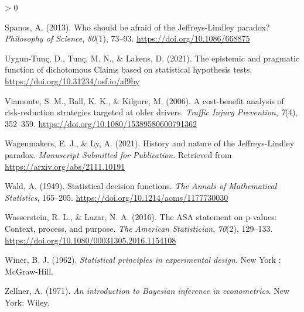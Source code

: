 \documentclass[
  english,
  ,man, a4paper,floatsintext]{apa6}
\newlength{\cslhangindent}
\newenvironment{CSLReferences}[2] %
 {%
  \setlength{\parindent}{0pt}
  \ifodd #1 \everypar{\setlength{\hangindent}{\cslhangindent}}\ignorespaces\fi
  \ifnum #2 > 0
  \setlength{\parskip}{#2\baselineskip}
  \fi
 }%
 {}
\begin{document}
\begin{CSLReferences}{1}{0}
\leavevmode\hypertarget{ref-spanos_2013}{}%
Spanos, A. (2013). Who should be afraid of the {Jeffreys}-{Lindley} paradox? \emph{Philosophy of Science}, \emph{80}(1), 73--93. \url{https://doi.org/10.1086/668875}

\leavevmode\hypertarget{ref-tunc_epistemic_2021}{}%
Uygun-Tunç, D., Tunç, M. N., \& Lakens, D. (2021). The epistemic and pragmatic function of dichotomous {Claims} based on statistical hypothesis tests. \url{https://doi.org/10.31234/osf.io/af9by}

\leavevmode\hypertarget{ref-viamonte2006cost}{}%
Viamonte, S. M., Ball, K. K., \& Kilgore, M. (2006). A cost-benefit analysis of risk-reduction strategies targeted at older drivers. \emph{Traffic Injury Prevention}, \emph{7}(4), 352--359. \url{https://doi.org/10.1080/15389580600791362}

\leavevmode\hypertarget{ref-WagenmakersJeffreys}{}%
Wagenmakers, E. J., \& Ly, A. (2021). History and nature of the {J}effreys-{L}indley paradox. \emph{Manuscript Submitted for Publication}. Retrieved from \url{https://arxiv.org/abs/2111.10191}

\leavevmode\hypertarget{ref-wald1949statistical}{}%
Wald, A. (1949). Statistical decision functions. \emph{The Annals of Mathematical Statistics}, 165--205. \url{https://doi.org/10.1214/aoms/1177730030}

\leavevmode\hypertarget{ref-wasserstein2016asa}{}%
Wasserstein, R. L., \& Lazar, N. A. (2016). The ASA statement on p-values: Context, process, and purpose. \emph{The American Statistician}, \emph{70}(2), 129--133. \url{https://doi.org/10.1080/00031305.2016.1154108}

\leavevmode\hypertarget{ref-winer_statistical_1962}{}%
Winer, B. J. (1962). \emph{Statistical principles in experimental design}. {New York : McGraw-Hill}.

\leavevmode\hypertarget{ref-zellner_introduction_1971}{}%
Zellner, A. (1971). \emph{An introduction to {Bayesian} inference in econometrics}. {New York}: {Wiley}.

\end{CSLReferences}

\endgroup
\end{document}
